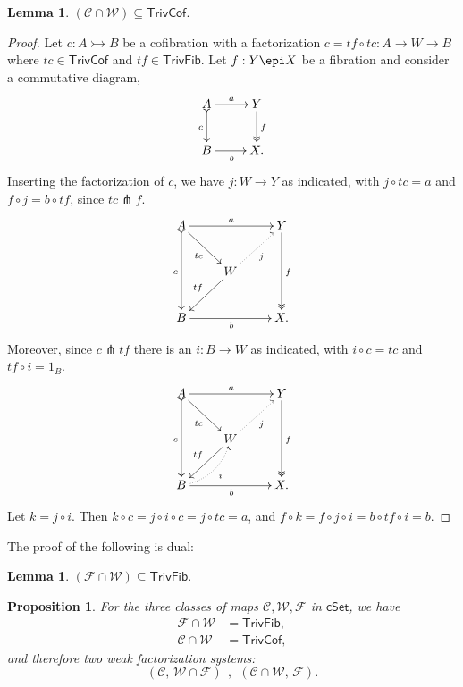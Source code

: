 \documentclass[11pt]{article}
\newcommand{\cSet}{\ensuremath{\mathsf{cSet}}}
\newcommand{\mono}{\ensuremath{\rightarrowtail}}
\newcommand{\ra}{\ensuremath{\rightarrow}}
\newtheorem{proposition}[theorem]{Proposition}
\newtheorem{lemma}[theorem]{Lemma}
\theoremstyle{remark}
\theoremstyle{definition}
\begin{document}
\begin{lemma}
$(\mathcal{C} \cap \mathcal{W})  \subseteq \mathsf{TrivCof}.$
\end{lemma}
\begin{proof}
Let $c : A\mono B$ be a cofibration with a factorization $c = tf\circ tc : A \to W\to B$ where $tc\in\mathsf{TrivCof}$ and $tf\in\mathsf{TrivFib}$.  Let $f:Y\epi X$ be a fibration and consider a commutative diagram,
\begin{equation*}%
\xymatrix{
A \ar@{>->}[d]_{c} \ar[r]^-{a}  & Y \ar@{>>}[d]^{f} \\
B \ar[r]_{b} &  X.
}
\end{equation*}
Inserting the factorization of $c$, we have $j : W\to Y$ as indicated, with $j\circ tc = a$ and $f\circ j = b\circ tf$, since $tc \pitchfork f$.
\begin{equation*}%
\xymatrix{
A \ar@{>->}[dd]_{c} \ar[rd]_{tc} \ar[rr]^-{a}  && Y \ar@{>>}[dd]^{f} \\
& W \ar[ld]_{tf} \ar@{.>}[ru]_{j} & \\
B \ar[rr]_{b} &&  X.
}
\end{equation*}
Moreover, since $c\pitchfork tf$ there is an $i : B \ra W$ as indicated, with $i\circ c = tc$ and $tf\circ i = 1_B$.
\begin{equation*}%
\xymatrix{
A \ar@{>->}[dd]_{c} \ar[rd]_{tc} \ar[rr]^-{a}  && Y \ar@{>>}[dd]^{f} \\
& W \ar[ld]_{tf} \ar@{.>}[ru]_{j} & \\
B \ar[rr]_{b} \ar@{.>}@/_2ex/[ru]_--{i} &&  X.
}
\end{equation*}
Let $k = j\circ i$. Then $k \circ c = j\circ i \circ c = j \circ tc = a$, and $f \circ k = f\circ j\circ i = b\circ tf\circ i = b$.
\end{proof}

The proof of the following is dual:
\begin{lemma}
$(\mathcal{F} \cap \mathcal{W})  \subseteq \mathsf{TrivFib}.$
\end{lemma}

\begin{proposition}
For the three classes of maps $\mathcal{C}, \mathcal{W}, \mathcal{F}$ in \cSet, we have 
\begin{align*}
\mathcal{F}\cap\mathcal{W} &= \mathsf{TrivFib}, \\
\mathcal{C}\cap\mathcal{W} &= \mathsf{TrivCof},
\end{align*}
and therefore two weak factorization systems:
\[
(\mathcal{C},\, \mathcal{W}\cap\mathcal{F})\ \ ,\ \ (\mathcal{C}\cap\mathcal{W},\, \mathcal{F}).
\]
\end{proposition}
\end{document}
